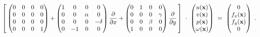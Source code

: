 \begin{equation}
	\left[ \,
	\begin{pmatrix}
		0 & 0 & 0 & 0 \\
		0 & 0 & 0 & 0 \\
		0 & 0 & 0 & 0 \\
		0 & 0 & 0 & 1
	\end{pmatrix} +
	\begin{pmatrix}
		1 & 0 & 0 & 0 \\
		0 & 0 & \alpha & 0 \\
		0 & 0 & 0 & -\delta \\
		0 & -1 & 0 & 0
	\end{pmatrix} \frac{\partial}{\partial x} +
	\begin{pmatrix}
		0 & 1 & 0 & 0 \\
		0 & 0 & 0 & \gamma \\
		0 & 0 & \beta & 0 \\
		1 & 0 & 0 & 0 \\
	\end{pmatrix} \frac{\partial}{\partial y} \, \right]
	\ \cdot \
	\begin{pmatrix}
		u(\mathbf{x}) \\ v(\mathbf{x}) \\ p(\mathbf{x}) \\ \omega(\mathbf{x})
	\end{pmatrix}
	\ = \
	\begin{pmatrix}
		0 \\ f_x(\mathbf{x}) \\ f_y(\mathbf{x}) \\ 0
	\end{pmatrix} \ .
\end{equation}